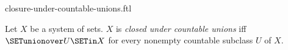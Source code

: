 \documentclass{naproche-library}
\begin{document}
\begin{smodule}[title=Closure Under Countable Unions]{closure-under-countable-unions.ftl}

\begin{definition}[forthel,id=FOUNDATIONS_14_2377279311183872]
  Let $X$ be a system of sets.
  $X$ is \emph{closed under countable unions} iff $\SETunionover U \SETin X$ for every nonempty countable subclass $U$ of $ X$.
\end{definition}
\end{smodule}
\end{document}
